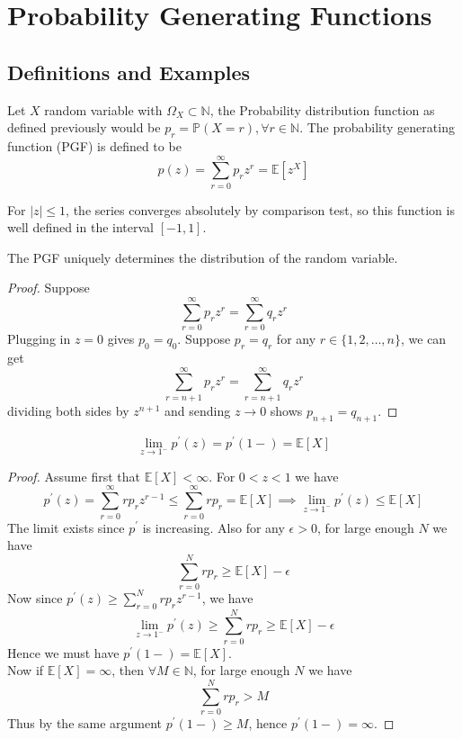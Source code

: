 \section{Probability Generating Functions}
\subsection{Definitions and Examples}
\begin{definition}
    Let $X$ random variable with $\Omega_X\subset\mathbb N$, the Probability distribution function as defined previously would be $p_r=\mathbb P(X=r),\forall r\in\mathbb N$.
    The probability generating function (PGF) is defined to be
    $$p(z)=\sum_{r=0}^\infty p_rz^r=\mathbb E[z^X]$$
\end{definition}
For $|z|\le1$, the series converges absolutely by comparison test, so this function is well defined in the interval $[-1,1]$.
\begin{theorem}
    The PGF uniquely determines the distribution of the random variable.
\end{theorem}
\begin{proof}
    Suppose
    $$\sum_{r=0}^\infty p_rz^r=\sum_{r=0}^\infty q_rz^r$$
    Plugging in $z=0$ gives $p_0=q_0$.
    Suppose $p_r=q_r$ for any $r\in\{1,2,\ldots,n\}$, we can get
    $$\sum_{r=n+1}^\infty p_rz^r=\sum_{r=n+1}^\infty q_rz^r$$
    dividing both sides by $z^{n+1}$ and sending $z\to0$ shows $p_{n+1}=q_{n+1}$.
\end{proof}
\begin{theorem}
    $$\lim_{z\to 1^-}p^\prime(z)=p^\prime(1-)=\mathbb E[X]$$
\end{theorem}
\begin{proof}
    Assume first that $\mathbb E[X]<\infty$.
    For $0<z<1$ we have
    $$p^\prime(z)=\sum_{r=0}^\infty rp_rz^{r-1}\le\sum_{r=0}^\infty rp_r=\mathbb E[X]\implies \lim_{z\to 1^-}p^\prime(z)\le \mathbb E[X]$$
    The limit exists since $p^\prime$ is increasing.
    Also for any $\epsilon>0$, for large enough $N$ we have
    $$\sum_{r=0}^Nrp_r\ge\mathbb E[X]-\epsilon$$
    Now since $p^\prime(z)\ge\sum_{r=0}^Nrp_rz^{r-1}$, we have
    $$\lim_{z\to 1^-}p^\prime(z)\ge\sum_{r=0}^Nrp_r\ge\mathbb E[X]-\epsilon$$
    Hence we must have $p^\prime(1-)=\mathbb E[X]$.\\
    Now if $\mathbb E[X]=\infty$, then $\forall M\in\mathbb N$, for large enough $N$ we have
    $$\sum_{r=0}^Nrp_r>M$$
    Thus by the same argument $p^\prime(1-)\ge M$, hence $p^\prime(1-)=\infty$.
\end{proof}
